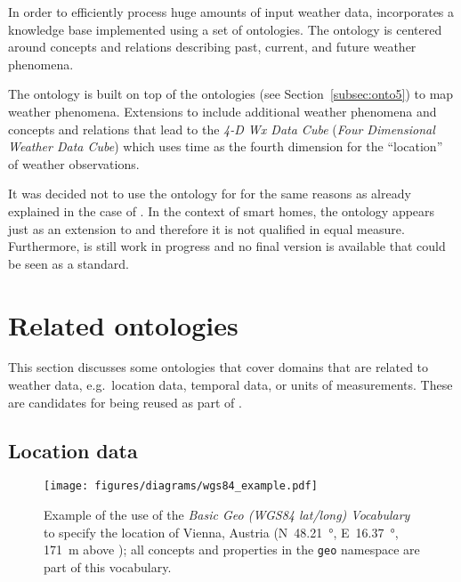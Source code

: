 In order to efficiently process huge amounts of input weather data,  incorporates a knowledge base implemented using a set of ontologies. The  ontology is centered around concepts and relations describing past, current, and future weather phenomena.

The  ontology is built on top of the  ontologies (see Section~\ref{subsec:onto5}) to map weather phenomena. Extensions to  include additional weather phenomena and concepts and relations that lead to the \emph{4-D Wx Data Cube} (\emph{Four Dimensional Weather Data Cube}) which uses time as the fourth dimension for the ``location'' of weather observations.

It was decided not to use the  ontology for \smarthomeweather for the same reasons as already explained in the case of . In the context of smart homes, the  ontology appears just as an extension to  and therefore it is not qualified in equal measure. Furthermore,  is still work in progress and no final version is available that could be seen as a standard.

\section{Related ontologies}
\label{sec:related_ontologies}

This section discusses some ontologies that cover domains that are related to weather data, e.g.\ location data, temporal data, or units of measurements. These are candidates for being reused as part of \smarthomeweather.

\subsection{Location data}
\label{subsec:location_ontologies}

\begin{figure}
\centering
\texttt{[image: figures/diagrams/wgs84\_example.pdf]}
\caption[Example of the use of the \emph{Basic Geo (WGS84 lat/long) Vocabulary}]{Example of the use of the \emph{Basic Geo (WGS84 lat/long) Vocabulary} to specify the location of Vienna, Austria (N~\SI{48.21}{\degree}, E~\SI{16.37}{\degree}, \SI{171}{\metre} above ); all concepts and properties in the \texttt{geo} namespace are part of this vocabulary.}
\label{fig:wgs84_example}
\end{figure}

